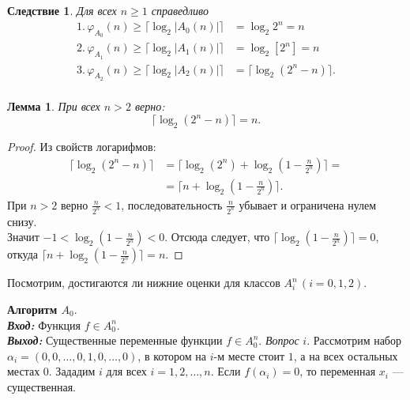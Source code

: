 \documentclass[oneside, final, 14pt]{extreport}
\newtheorem{lem}{Лемма}
\newtheorem{sled}{Следствие}
\begin{document}
	\begin{sled} 
	\label{s1}
	Для всех $n \geq 1$ справедливо
	\begin{displaymath}
		\begin{aligned}
			1.\, \varphi_{A_0}(n) \geq \lceil \log_2{|A_0(n)|} \rceil & = \log_2{2^n} = n  \\		
			2.\, \varphi_{A_1}(n) \geq \lceil \log_2{|A_1(n)|} \rceil & = \log_2[2^n] = n  \\
			3.\, \varphi_{A_2}(n) \geq \lceil \log_2{|A_2(n)|} \rceil & = \lceil \log_2(2^n - n) \rceil.  \\
		\end{aligned}
	\end{displaymath}
	\end{sled}
	
	\begin{lem}
		\label{log}
		При всех $ n > 2$ верно:
		$$\lceil \log_2(2^n - n) \rceil = n.$$
	\end{lem}
	\begin{proof}
		Из свойств логарифмов:
		\begin{displaymath}
		\begin{aligned}
		\lceil \log_2(2^n - n) \rceil & = \lceil \log_2(2^n) + \log_2(1 - \frac{n}{2^n}) \rceil =\\
												&= \lceil n + \log_2(1 - \frac{n}{2^n}) \rceil.	
	    \end{aligned}
		\end{displaymath}
		При $n > 2$ верно $\frac{n}{2^n} < 1$, последовательность $\frac{n}{2^n}$ убывает и ограничена нулем снизу. \\
		Значит  $ -1 < \log_2(1 - \frac{n}{2^n}) < 0$.
		Отсюда следует, что $\lceil \log_2(1 - \frac{n}{2^n})\rceil = 0 $, откуда $\lceil n + \log_2(1 - \frac{n}{2^n}) \rceil = n$.
	\end{proof} \par
	\bigskip
	\noindent Посмотрим, достигаются ли нижние оценки для классов $A_i^n \, (i= 0,1,2)$. \par
	\bigskip
	
	\noindent\textbf{Алгоритм $A_0$}. \\
	 \emph{\textbf{Вход:}} Функция $f \in A_0^n$.\\
	 \emph{\textbf{Выход:}} Существенные переменные функции $f \in A_0^n$.
	 \emph{Вопрос} $i$. Рассмотрим набор $\alpha_i = (0, 0,  \ldots, 0, 1, 0, \ldots, 0)$, в котором на $i$-м месте стоит $1$, а на всех остальных местах $0$.
	 Зададим $i$ для всех $i = 1, 2, \ldots, n$. Если $f(\alpha_i) = 0$, то переменная $x_i$ --- существенная. \\
	  
\end{document}
